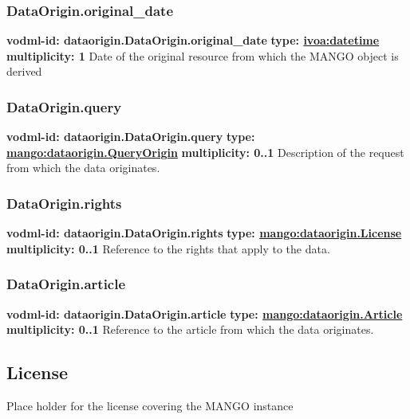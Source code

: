     \subsubsection{DataOrigin.original\_date}
      \textbf{vodml-id: dataorigin.DataOrigin.original\_date} \newline
      \textbf{type: \hyperref[sect:ivoa]{ivoa:datetime}} \newline
      \textbf{multiplicity: 1} \newline 
      Date of the original resource from which the MANGO object is derived

    \subsubsection{DataOrigin.query}
      \textbf{vodml-id: dataorigin.DataOrigin.query} \newline
      \textbf{type: \hyperref[sect:dataorigin.QueryOrigin]{mango:dataorigin.QueryOrigin}} \newline
      \textbf{multiplicity: 0..1} \newline 
      Description of the request from which the data originates.

    \subsubsection{DataOrigin.rights}
      \textbf{vodml-id: dataorigin.DataOrigin.rights} \newline
      \textbf{type: \hyperref[sect:dataorigin.License]{mango:dataorigin.License}} \newline
      \textbf{multiplicity: 0..1} \newline 
      Reference to the rights that apply to the data.

    \subsubsection{DataOrigin.article}
      \textbf{vodml-id: dataorigin.DataOrigin.article} \newline
      \textbf{type: \hyperref[sect:dataorigin.Article]{mango:dataorigin.Article}} \newline
      \textbf{multiplicity: 0..1} \newline 
      Reference to the article from which the data originates.

  \subsection{License}
  \label{sect:dataorigin.License}
    Place holder for the license covering the MANGO instance

